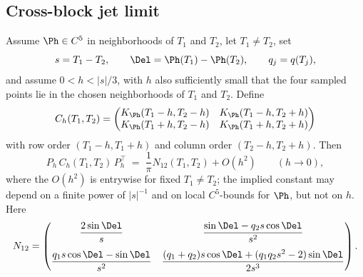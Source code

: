 \subsection{Cross-block jet limit}
\label{subsec:cross-block-jet-limit}

\begin{lemma}
\label{lem:cross-block-jet-limit}
Assume \(\Ph\in C^5\) in neighborhoods of \(T_1\) and \(T_2\), let
\(T_1\ne T_2\), set
\[
        s = T_1 - T_2,
        \qquad \Del = \Ph(T_1)-\Ph(T_2),
        \qquad q_j = q(T_j),
\]
and assume \(0 < h < |s|/3\), with \(h\) also sufficiently small that
the four sampled points lie in the chosen neighborhoods of \(T_1\) and
\(T_2\).  Define
\[
C_h(T_1, T_2)=
\begin{pmatrix}
K_\Ph(T_1-h, T_2-h) & K_\Ph(T_1-h, T_2+h)\\
K_\Ph(T_1+h, T_2-h) & K_\Ph(T_1+h, T_2+h)
\end{pmatrix}
\]
with row order \((T_1-h, T_1+h)\) and column order \((T_2-h, T_2+h)\).
Then
\[
        P_h\,C_h(T_1, T_2)\,P_h^\top
        \;=\; \frac1\pi N_{12}(T_1, T_2) + O(h^2)
        \qquad (h\to 0),
\]
where the \(O(h^2)\) is entrywise for fixed \(T_1\ne T_2\); the implied
constant may depend on a finite power of \(|s|^{-1}\) and on local
\(C^5\)-bounds for \(\Ph\), but not on \(h\).  Here
\begin{equation}
\label{eq:cross-N12}
N_{12}=
\begin{pmatrix}
\dfrac{2\sin\Del}{s}
&
\dfrac{\sin\Del - q_2 s\cos\Del}{s^2}
\\[2.4ex]
\dfrac{q_1 s\cos\Del - \sin\Del}{s^2}
&
\dfrac{(q_1+q_2)s\cos\Del + (q_1 q_2 s^2 - 2)\sin\Del}{2s^3}
\end{pmatrix}.
\end{equation}
\end{lemma}

